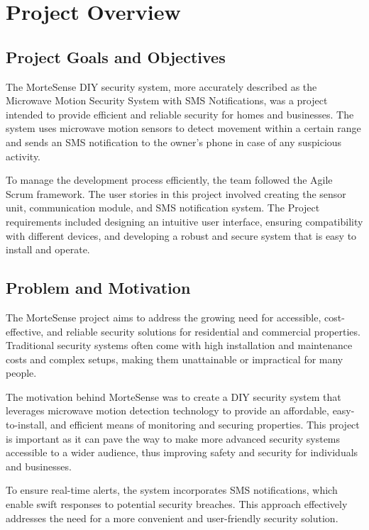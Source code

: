 \section{Project Overview}\label{sec:project-overview}

\subsection{Project Goals and Objectives}\label{subsec:project-goals-and-objectives}
The MorteSense DIY security system, more accurately described as the Microwave Motion
Security System with SMS Notifications, was a project intended to provide efficient
and reliable security for homes and businesses. %
The system uses microwave motion sensors to detect movement within a certain range and sends an SMS notification to the owner's
phone in case of any suspicious activity. %

To manage the development process efficiently, the team followed the Agile Scrum framework. %
The user stories in this project involved creating the sensor unit, communication module,
and SMS notification system. %
The Project requirements included designing an intuitive user interface, ensuring compatibility with different devices, and developing a robust and
secure system that is easy to install and operate. %

\subsection{Problem and Motivation}\label{subsec:problem-and-motivation}

The MorteSense project aims to address the growing need for accessible, cost-effective,
and reliable security solutions for residential and commercial properties. %
Traditional security systems often come with high installation and maintenance costs and complex
setups, making them unattainable or impractical for many people. %

The motivation behind MorteSense was to create a DIY security system that leverages
microwave motion detection technology to provide an affordable, easy-to-install, and
efficient means of monitoring and securing properties. %
This project is important as it can pave the way to make more advanced security systems accessible to a wider
audience, thus improving safety and security for individuals and businesses. %

To ensure real-time alerts, the system incorporates SMS notifications, which enable
swift responses to potential security breaches. %
This approach effectively addresses the need for a more convenient and user-friendly security solution. %

